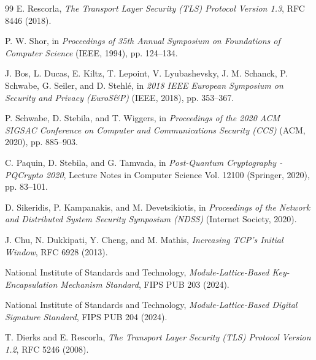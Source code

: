 \documentclass[10pt,twocolumn,a4paper]{article}
\begin{document}
\begin{thebibliography}{99}
\footnotesize
\setlength{\itemsep}{0pt}
\setlength{\parskip}{0pt}
E. Rescorla, \textit{The Transport Layer Security (TLS) Protocol Version 1.3}, RFC 8446 (2018).

P. W. Shor, in \textit{Proceedings of 35th Annual Symposium on Foundations of Computer Science} (IEEE, 1994), pp. 124--134.

J. Bos, L. Ducas, E. Kiltz, T. Lepoint, V. Lyubashevsky, J. M. Schanck, P. Schwabe, G. Seiler, and D. Stehl{\'e}, in \textit{2018 IEEE European Symposium on Security and Privacy (EuroS\&P)} (IEEE, 2018), pp. 353--367.

P. Schwabe, D. Stebila, and T. Wiggers, in \textit{Proceedings of the 2020 ACM SIGSAC Conference on Computer and Communications Security (CCS)} (ACM, 2020), pp. 885--903.

C. Paquin, D. Stebila, and G. Tamvada, in \textit{Post-Quantum Cryptography - PQCrypto 2020}, Lecture Notes in Computer Science Vol. 12100 (Springer, 2020), pp. 83--101.

D. Sikeridis, P. Kampanakis, and M. Devetsikiotis, in \textit{Proceedings of the Network and Distributed System Security Symposium (NDSS)} (Internet Society, 2020).

J. Chu, N. Dukkipati, Y. Cheng, and M. Mathis, \textit{Increasing TCP's Initial Window}, RFC 6928 (2013).

National Institute of Standards and Technology, \textit{Module-Lattice-Based Key-Encapsulation Mechanism Standard}, FIPS PUB 203 (2024).

National Institute of Standards and Technology, \textit{Module-Lattice-Based Digital Signature Standard}, FIPS PUB 204 (2024).

T. Dierks and E. Rescorla, \textit{The Transport Layer Security (TLS) Protocol Version 1.2}, RFC 5246 (2008).

\end{thebibliography}
\end{document}
